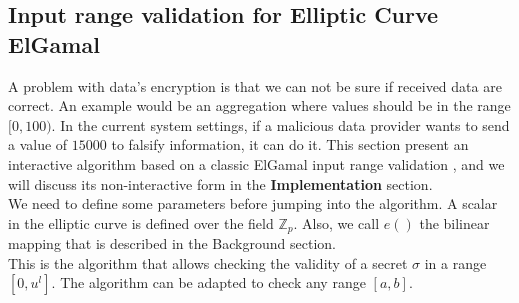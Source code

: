 \documentclass{article}
\begin{document}
\subsection{Input range validation for Elliptic Curve ElGamal}

A problem with data's encryption is that we can not be sure if received data are correct. An example would be an aggregation where values should be in the range $[0,100)$. In the current system settings, if a malicious data provider wants to send a value of $15000$ to falsify information, it can do it. This section present an  interactive algorithm based on a classic ElGamal input range validation \cite{range}, and we will discuss its non-interactive form in the \textbf{Implementation} section.\\
We need to define some parameters before jumping into the algorithm. A scalar in the elliptic curve is defined over the field $\mathbb{Z}_p$. Also, we call $e()$ the bilinear mapping that is described in the Background section.\\
This is the algorithm that allows checking the validity of a secret $\sigma$ in a range $ [0,u^l]$. The algorithm can be adapted to check any range $[a,b]$.\\
\end{document}
